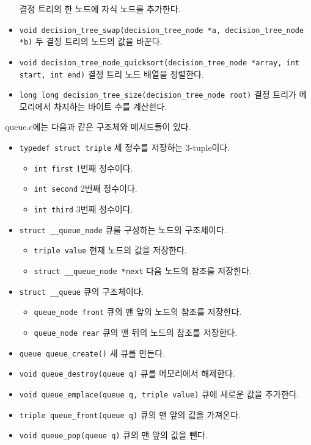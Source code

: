 \begin{itemize}
    결정 트리의 한 노드에 자식 노드를 추가한다.
    \item \texttt{void decision_tree_swap(decision_tree_node *a, decision_tree_node *b)}
    두 결정 트리의 노드의 값을 바꾼다.
    \item \texttt{void decision_tree_node_quicksort(decision_tree_node *array, int start, int end)}
    결정 트리 노드 배열을 정렬한다.
    \item \texttt{long long decision_tree_size(decision_tree_node root)}
    결정 트리가 메모리에서 차지하는 바이트 수를 계산한다.
\end{itemize}

queue.c에는 다음과 같은 구조체와 메서드들이 있다.

\begin{itemize}
    \item \texttt{typedef struct triple}
    세 정수를 저장하는 3-tuple이다.
    \begin{itemize}
        \item \texttt{int first} 1번째 정수이다.
        \item \texttt{int second} 2번째 정수이다.
        \item \texttt{int third} 3번째 정수이다.
    \end{itemize}
    \item \texttt{struct __queue_node}
    큐를 구성하는 노드의 구조체이다.
    \begin{itemize}
        \item \texttt{triple value} 현재 노드의 값을 저장한다.
        \item \texttt{struct __queue_node *next} 다음 노드의 참조를 저장한다.
    \end{itemize}
    \item \texttt{struct __queue}
    큐의 구조체이다.
    \begin{itemize}
        \item \texttt{queue_node front} 큐의 맨 앞의 노드의 참조를 저장한다.
        \item \texttt{queue_node rear} 큐의 맨 뒤의 노드의 참조를 저장한다.
    \end{itemize}
    \item \texttt{queue queue_create()}
    새 큐를 만든다.
    \item \texttt{void queue_destroy(queue q)}
    큐를 메모리에서 해제한다.
    \item \texttt{void queue_emplace(queue q, triple value)}
    큐에 새로운 값을 추가한다.
    \item \texttt{triple queue_front(queue q)}
    큐의 맨 앞의 값을 가져온다.
    \item \texttt{void queue_pop(queue q)}
    큐의 맨 앞의 값을 뺀다.
\end{itemize}

